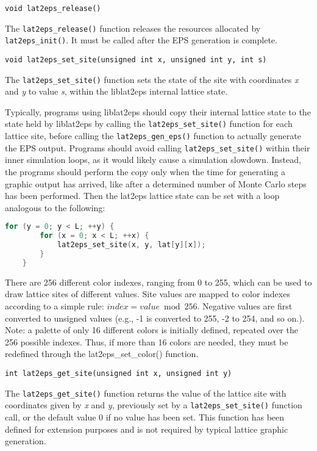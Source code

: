 \documentclass[a4paper]{article}
\begin{document}
\texttt{void lat2eps\_release()}
\bigbreak

The \texttt{lat2eps\_release()} function releases the resources allocated by \texttt{lat2eps\_init()}. It must be called after the EPS generation is complete.
\bigbreak\bigbreak


\texttt{void lat2eps\_set\_site(unsigned int x, unsigned int y, int s)}
\bigbreak

The \texttt{lat2eps\_set\_site()} function sets the state of the site with coordinates \textit{x} and \textit{y} to value \textit{s}, within the liblat2eps internal lattice state.
\bigbreak

Typically, programs using liblat2eps should copy their internal lattice state to the state held by liblat2eps by calling the \texttt{lat2eps\_set\_site()} function for each lattice site, before calling the \texttt{lat2eps\_gen\_eps()} function to actually generate the EPS output. Programs should avoid calling \texttt{lat2eps\_set\_site()} within their inner simulation loops, as it would likely cause a simulation slowdown. Instead, the programs should perform the copy only when the time for generating a graphic output has arrived, like after a determined number of Monte Carlo steps has been performed. Then the lat2eps lattice state can be set with a loop analogous to the following:
\bigbreak

\begin{lstlisting}[language=C]
	for (y = 0; y < L; ++y) {
		for (x = 0; x < L; ++x) {
			lat2eps_set_site(x, y, lat[y][x]);
		}
	}
\end{lstlisting}
\bigbreak

There are 256 different color indexes, ranging from 0 to 255, which can be used to draw lattice sites of different values. Site values are mapped to color indexes according to a simple rule: $index = value \bmod 256$. Negative values are first converted to unsigned values (e.g., -1 is converted to 255, -2 to 254, and so on.). Note: a palette of only 16 different colors is initially defined, repeated over the 256 possible indexes. Thus, if more than 16 colors are needed, they must be redefined through the lat2eps\_set\_color() function.
\bigbreak\bigbreak


\texttt{int lat2eps\_get\_site(unsigned int x, unsigned int y)}
\bigbreak

The \texttt{lat2eps\_get\_site()} function returns the value of the lattice site with coordinates given by \textit{x} and \textit{y}, previously set by a \texttt{lat2eps\_set\_site()} function call, or the default value 0 if no value has been set. This function has been defined for extension purposes and is not required by typical lattice graphic generation.
\bigbreak\bigbreak
\end{document}
